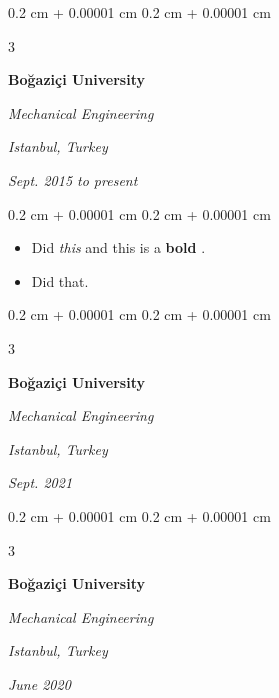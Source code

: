 \documentclass[10pt, letterpaper]{article}
\newenvironment{highlights}{
    \begin{itemize}[
        topsep=0.10 cm,
        parsep=0.10 cm,
        partopsep=0pt,
        itemsep=0pt,
        leftmargin=0.4 cm + 10pt + 0.6 cm
    ]
}{
    \end{itemize}
} %
\newenvironment{onecolentry}{
    \begin{adjustwidth}{
        0.2 cm + 0.00001 cm
    }{
        0.2 cm + 0.00001 cm
    }
}{
    \end{adjustwidth}
} %
\newenvironment{threecolentry}[3][]{
    \onecolentry
    \def\thirdColumn{#3}
    \setcolumnwidth{0.6 cm, \fill, 4.5 cm}
    \begin{paracol}{3}
    #2 \switchcolumn
}{
    \switchcolumn \raggedleft \thirdColumn
    \end{paracol}
    \endonecolentry
} %
\let\hrefWithoutArrow\href
\renewcommand{\href}[2]{\hrefWithoutArrow{#1}{\mbox{\ifthenelse{\equal{#2}{}}{ }{#2 }\raisebox{.15ex}{\footnotesize \faExternalLink*}}}}
\begin{document}
        \vspace{0.2 cm-3px}

        \begin{threecolentry}{
            \vspace*{\fill}
            \textbullet
            \vspace*{3px}
            \vspace*{\fill}
        }{
        \textit{Istanbul, Turkey}    
            
        \textit{Sept. 2015 to present}}
            \textbf{Boğaziçi University}

            \textit{Mechanical Engineering}
        \end{threecolentry}

        \vspace{0.10 cm-3px}
        \begin{onecolentry}
            \begin{highlights}
                \item Did \textit{this} and this is a \textbf{bold} \href{https://example.com}{link}.
                \item Did that.
            \end{highlights}
        \end{onecolentry}


        \vspace{0.2 cm-3px}

        \begin{threecolentry}{
            \vspace*{\fill}
            \textbullet
            \vspace*{3px}
            \vspace*{\fill}
        }{
        \textit{Istanbul, Turkey}    
            
        \textit{Sept. 2021}}
            \textbf{Boğaziçi University}

            \textit{Mechanical Engineering}
        \end{threecolentry}



        \vspace{0.2 cm-3px}

        \begin{threecolentry}{
            \vspace*{\fill}
            \textbullet
            \vspace*{3px}
            \vspace*{\fill}
        }{
        \textit{Istanbul, Turkey}    
            
        \textit{June 2020}}
            \textbf{Boğaziçi University}

            \textit{Mechanical Engineering}
        \end{threecolentry}
\end{document}
